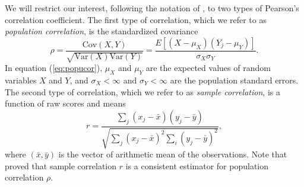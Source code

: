 \documentclass[12pt, a4paper]{article}
\newcommand{\cov}{\text{Cov}}
\newcommand{\var}{\text{Var}}
\newcommand{\samplecor}{sample correlation}
\newcommand{\popucor}{population correlation}
\begin{document}
	We will restrict our interest, following the notation of 
	\citet{lee1988thirteen},  to two 
	types of Pearson's correlation coefficient. The first type of correlation, which we refer to as 
	\textit{\popucor}, is the standardized 
	covariance
	\begin{equation}\label{eq:popucor}
	\rho =\dfrac{\cov(X, Y)}{\sqrt{\var(X)\var(Y)}} = 
	\dfrac{E[(X-\mu_X)(Y_j-\mu_Y)]}{\sigma_X\sigma_Y}.
	\end{equation} 
	In equation (\ref{eq:popucor}), $\mu_X$ and $\mu_Y$ are the expected values of 
	random variables 
	$X$ and 
	$Y$,  and $\sigma_X<\infty$ and 
	$\sigma_Y<\infty$ are the population standard errors. The second type of correlation, which we 
	refer to as \textit{\samplecor}, is a function of raw scores and means
	\begin{equation}\label{eq:samplecor}
	r  =  \dfrac{\sum_j (x_j -\bar{x})(y_j - \bar{y})}{\sqrt{\sum_{j}(x_j - \bar{x})^2\sum_i(y_j - 
	\bar{y})^2}}, 
	\end{equation}
	where $(\bar{x}, \bar{y})$ is the vector of arithmetic mean of the observations. 
	Note that \citet{fisher1915frequency} proved that sample correlation $r$ is a consistent 
	estimator for 
	population correlation $\rho$.
	
\end{document}
